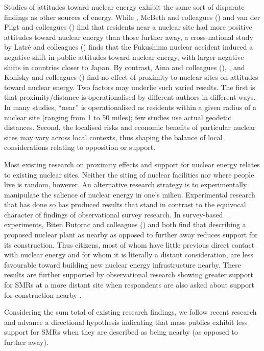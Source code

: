 \documentclass[a4paper, 11pt]{article}
\begin{document}
Studies of attitudes toward nuclear energy exhibit the same sort of disparate findings as other sources of energy. While \citet{greenberg2009}, McBeth and colleagues (\citeyear{mcbeth2023}) and van der Pligt and colleagues (\citeyear{vanderpligt1986}) find that residents near a nuclear site had more positive attitudes toward nuclear energy than those further away, a cross-national study by Latré and colleagues (\citeyear{latre2017}) finds that the Fukushima nuclear accident induced a negative shift in public attitudes toward nuclear energy, with larger negative shifts in countries closer to Japan. By contrast, Aina and colleagues (\citeyear{aina_baici_poy2026}), \citet{cale2015}, and Konisky and colleagues (\citeyear{konisky2020}) find no effect of proximity to nuclear sites on attitudes toward nuclear energy. Two factors may underlie such varied results. The first is that proximity/distance is operationalised by different authors in different ways. In many studies, ``near'' is operationalised as residents within a given radius of a nuclear site (ranging from 1 to 50 miles); few studies use actual geodetic distances. Second, the localised risks and economic benefits of particular nuclear sites may vary across local contexts, thus shaping the balance of local considerations relating to opposition or support.

Most existing research on proximity effects and support for nuclear energy relates to existing nuclear sites. Neither the siting of nuclear facilities nor where people live is random, however. An alternative research strategy is to experimentally manipulate the salience of nuclear energy in one's milieu. Experimental research that has done so has produced results that stand in contrast to the equivocal character of findings of observational survey research. In survey-based experiments, Biten Butorac and colleagues (\citeyear{biten2026}) and \citet{seo2026} both find that describing a proposed nuclear plant as nearby as opposed to further away reduces support for its construction. Thus citizens, most of whom have little previous direct contact with nuclear energy and for whom it is literally a distant consideration, are less favourable toward building new nuclear energy infrastructure nearby. These results are further supported by observational research showing greater support for SMRs at a more distant site when respondents are also asked about support for construction nearby \citep{durdovic2025,hlavacek2023,jones2026,kiviluoma2025}.

Considering the sum total of existing research findings, we follow recent research and advance a directional hypothesis indicating that mass publics exhibit less support for SMRs when they are described as being nearby (as opposed to further away).
\end{document}
